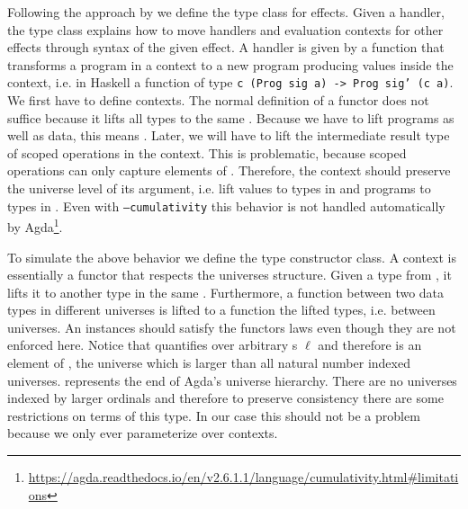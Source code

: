 Following the approach by \citeauthor{DBLP:conf/haskell/WuSH14} we define the
 type class for effects.
Given a handler, the type class explains how to move handlers and evaluation contexts
for other effects through syntax of the given effect.
A handler is given by a function that transforms a program in a context to a new
program producing values inside the context, i.e. in Haskell a function of type
\texttt{c (Prog sig a) -> Prog sig' (c a)}.
We first have to define contexts.
The normal definition of a functor does not suffice because it lifts all types
to the same .
Because we have to lift programs as well as data, this means .
Later, we will have to lift the intermediate result type of scoped operations in
the context.
This is problematic, because scoped operations can only capture elements of
.
Therefore, the context should preserve the universe level of its argument, i.e.
lift values to types in  and programs to types in
.
Even with \texttt{--cumulativity} this behavior is not handled automatically by
Agda\footnote{\url{https://agda.readthedocs.io/en/v2.6.1.1/language/cumulativity.html\#limitations}}.

To simulate the above behavior we define the  type
constructor class.
A context is essentially a functor that respects the universes structure.
Given a type from , it lifts it to another type in the same
.
Furthermore, a function between two data types in different universes is
lifted to a function the lifted types, i.e. between universes.
An instances should satisfy the functors laws even though they are not enforced
here.
Notice that  quantifies over arbitrary
s $\ell$ and therefore is an element of ,
the universe which is larger than all natural number indexed universes.
 represents the end of Agda's universe hierarchy.
There are no universes indexed by larger ordinals and therefore to preserve
consistency there are some restrictions on terms of this type.
In our case this should not be a problem because we only ever parameterize over
contexts.

